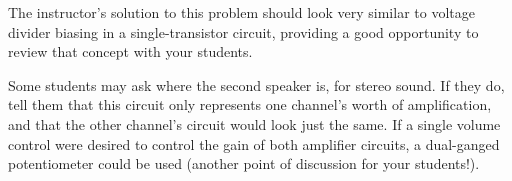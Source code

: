 The instructor's solution to this problem should look very similar to voltage divider biasing in a single-transistor circuit, providing a good opportunity to review that concept with your students.

Some students may ask where the second speaker is, for stereo sound.  If they do, tell them that this circuit only represents one channel's worth of amplification, and that the other channel's circuit would look just the same.  If a single volume control were desired to control the gain of both amplifier circuits, a dual-ganged potentiometer could be used (another point of discussion for your students!).




